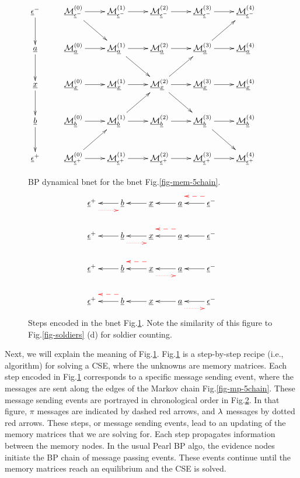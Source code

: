 \begin{figure}
$$\xymatrix{
\rveps^-\ar[d]
&\ucalm^{(0)}_{\rveps^-}\ar[r]\ar[dr]
&\ucalm^{(1)}_{\rveps^-}\ar[r]
&\ucalm^{(2)}_{\rveps^-}\ar[r]
&\ucalm^{(3)}_{\rveps^-}\ar[r]
&\ucalm^{(4)}_{\rveps^-}
&
\\
\rva\ar[d]
&\ucalm^{(0)}_{\rva}\ar[r]
&\ucalm^{(1)}_{\rva}\ar[r]\ar[dr]
&\ucalm^{(2)}_{\rva}\ar[r]
&\ucalm^{(3)}_{\rva}\ar[r]\ar[ur]
&\ucalm^{(4)}_{\rva}
\\
\rvx\ar[d]
&\ucalm^{(0)}_{\rvx}\ar[r]
&\ucalm^{(1)}_{\rvx}\ar[r]
&\ucalm^{(2)}_{\rvx}\ar[r]\ar[dr]\ar[ur]
&\ucalm^{(3)}_{\rvx}\ar[r]
&\ucalm^{(4)}_{\rvx}
\\
\rvb\ar[d]
&\ucalm^{(0)}_{\rvb}\ar[r]
&\ucalm^{(1)}_{\rvb}\ar[r]\ar[ur]
&\ucalm^{(2)}_{\rvb}\ar[r]
&\ucalm^{(3)}_{\rvb}\ar[r]\ar[dr]
&\ucalm^{(4)}_{\rvb}
\\
\rveps^+
&\ucalm^{(0)}_{\rveps^+}\ar[r]\ar[ur]
&\ucalm^{(1)}_{\rveps^+}\ar[r]
&\ucalm^{(2)}_{\rveps^+}\ar[r]
&\ucalm^{(3)}_{\rveps^+}\ar[r]
&\ucalm^{(4)}_{\rveps^+}
}$$
\caption{BP dynamical bnet for the bnet
  Fig.\ref{fig-mem-5chain}.}
\label{fig-propagation-5chain}
\end{figure}

\begin{figure}[h!]
$$
\xymatrix{
\rveps^+\ar@[red]@{.>}@<-2ex>[r]
&\rvb\ar[l]
&\rvx\ar[l]
&\rva\ar[l]
&\rveps^-\ar[l]\ar@[red]@{-->}@<-2ex>[l]
\\
\rveps^+
&\rvb\ar[l]\ar@[red]@{.>}@<-2ex>[r]
&\rvx\ar[l]
&\rva\ar[l]\ar@[red]@{-->}@<-2ex>[l]
&\rveps^-\ar[l]
\\
\rveps^+
&\rvb\ar[l]
&\rvx\ar[l]\ar@[red]@{.>}@<-2ex>[r]
\ar@[red]@{-->}@<-2ex>[l]
&\rva\ar[l]
&\rveps^-\ar[l]
\\
\rveps^+
&\rvb\ar[l]\ar@[red]@{-->}@<-2ex>[l]
&\rvx\ar[l]
&\rva\ar[l]\ar@[red]@{.>}@<-2ex>[r]
&\rveps^-\ar[l]
}$$
\caption{
Steps encoded in the 
bnet 
Fig.\ref{fig-propagation-5chain}.
Note the 
similarity 
of this figure 
to Fig.\ref{fig-soldiers} (d)
for soldier counting.
} 
\label{fig-multiframe-5chain}
\end{figure}

Next, we will
explain the meaning
of Fig.\ref{fig-propagation-5chain}.
Fig.\ref{fig-propagation-5chain}
is a step-by-step
recipe (i.e., algorithm)
for solving a CSE,
where the unknowns are
memory matrices.
Each step
encoded in
Fig.\ref{fig-propagation-5chain}
corresponds to a
specific
message sending event,
where the messages
are sent
along the edges 
of the Markov chain
Fig.\ref{fig-mp-5chain}.
These message sending
events are portrayed in
chronological order
in Fig.\ref{fig-multiframe-5chain}.
In that figure,
$\pi$ messages
are indicated by
dashed red arrows,
and $\lambda$ messages
by dotted red arrows.  
These steps, or
message  sending events,
lead to an updating
of the memory matrices
that we are solving for.
Each step propagates information
between the memory nodes.
In the usual Pearl BP algo, 
the evidence nodes 
initiate the BP
chain of 
message passing events.
These events 
continue
until 
the 
memory 
matrices
reach an equilibrium
and the CSE is solved.


